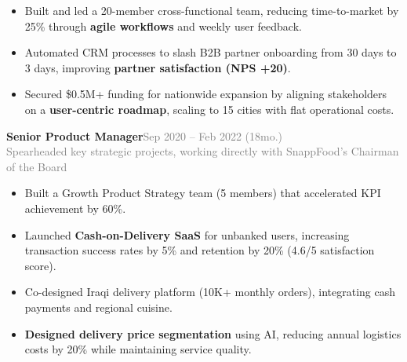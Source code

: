 \documentclass[a4paper,10pt]{article}
\newcommand{\position}[1]{\Large\bfseries #1}\vspace{0.1em}
\newcommand{\bulletitem}[1]{\item #1\vspace{0.1em}}
\newcommand{\graytext}[1]{\textcolor{grey}{#1}} %
\begin{document}
{\begin{adjustwidth}{0.5cm}{0cm}
\begin{adjustwidth}{0.5cm}{0cm}
\normalsize
\begin{itemize}
  \bulletitem{Built and led a 20-member cross-functional team, reducing time-to-market by 25\% through \textbf{agile workflows} and weekly user feedback.}
  \bulletitem{Automated CRM processes to slash B2B partner onboarding from 30 days to 3 days, improving \textbf{partner satisfaction (NPS +20)}.}
  \bulletitem{Secured \$0.5M+ funding for nationwide expansion by aligning stakeholders on a \textbf{user-centric roadmap}, scaling to 15 cities with flat operational costs.}
\end{itemize}
\end{adjustwidth}
\vspace{3pt}
{{\position{Senior Product Manager}}\hfill {\large\graytext{Sep 2020 – Feb 2022 (18mo.)}}}
\\
{\small\graytext{Spearheaded key strategic projects, working directly with SnappFood's Chairman of the Board}}
\normalsize
\begin{adjustwidth}{0.5cm}{0cm}
\begin{itemize}
  \bulletitem{Built a Growth Product Strategy team (5 members) that accelerated KPI achievement by 60\%.}
  \bulletitem{Launched \textbf{Cash-on-Delivery SaaS} for unbanked users, increasing transaction success rates by 5\% and retention by 20\% (4.6/5 satisfaction score).}
  \bulletitem{Co-designed Iraqi delivery platform (10K+ monthly orders), integrating cash payments and regional cuisine.}
  \bulletitem{\textbf{Designed delivery price segmentation} using AI, reducing annual logistics costs by 20\% while maintaining service quality.}

\end{itemize}
\end{adjustwidth}
\vspace{3pt}


\end{adjustwidth}}
\end{document}
